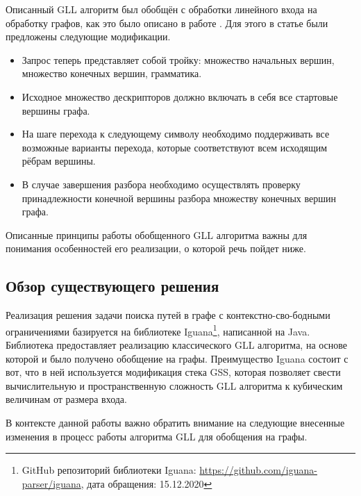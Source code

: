 \documentclass[14pt]{matmex-diploma-custom}
\theoremstyle{definition}
\begin{document}
Описанный GLL алгоритм был обобщён с обработки линейного входа на обработку графов, как это было описано в работе \cite{10.1145/3166094.3166104}.
Для этого в статье были предложены следующие модификации.
\begin{itemize}
\item  Запрос теперь представляет собой тройку: множество начальных вершин, множество конечных вершин, грамматика.
\item Исходное множество дескрипторов должно включать в себя все стартовые вершины графа.
\item На шаге перехода к следующему символу необходимо поддерживать все возможные варианты перехода, которые соответствуют всем исходящим рёбрам вершины.
\item В случае завершения разбора необходимо осуществлять проверку принадлежности конечной вершины разбора множеству конечных вершин графа.
\end{itemize}

Описанные принципы работы обобщенного GLL алгоритма важны для понимания особенностей его реализации, о которой речь пойдет ниже.


\subsection{Обзор существующего решения}
Реализация решения задачи поиска путей в графе с контекстно-сво-бодными ограничениями базируется на библиотеке Iguana\footnote{ GitHub репозиторий библиотеки Iguana: \url{https://github.com/iguana-parser/iguana},  дата обращения: 15.12.2020}, написанной на Java.
Библиотека предоставляет реализацию классического GLL алгоритма, на основе которой и было получено обобщение на графы.
Преимущество Iguana состоит с вот, что в ней используется модификация стека GSS, которая позволяет свести вычислительную и пространственную сложность GLL алгоритма к кубическим величинам от размера входа. 

В контексте данной работы важно обратить внимание на следующие внесенные изменения в процесс работы алгоритма GLL для обобщения на графы.
\end{document}
